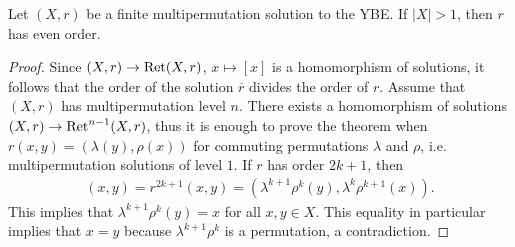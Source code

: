 


    

    

\begin{theorem}\label{thm:ordermultipermutiation}
    Let $(X,r)$ be a finite multipermutation solution to the YBE. If $|X|>1$, then $r$ has even order. 
\end{theorem}

\begin{proof}
    Since $(X,r)\to\operatorname{Ret}(X,r)$, $x\mapsto[x]$ is a homomorphism of solutions, 
    it follows that the order of the solution $\overline{r}$ divides the order of $r$. 
    Assume that $(X,r)$ has multipermutation level $n$. 
    There exists a homomorphism of solutions $(X,r)\to\operatorname{Ret}^{n-1}(X,r)$, thus 
    it is enough to prove the theorem when
    $r(x,y)=(\lambda(y),\rho(x))$ for commuting permutations $\lambda$ and $\rho$, i.e. 
    multipermutation solutions of level $1$. If $r$ has order $2k+1$, then 
    \begin{align*}
        (x,y)=r^{2k+1}(x,y)=(\lambda^{k+1}\rho^k(y),\lambda^k\rho^{k+1}(x)).
    \end{align*}
    This implies that $\lambda^{k+1}\rho^k(y)=x$ for all $x,y\in X$. This equality in particular 
    implies that $x=y$ because $\lambda^{k+1}\rho^k$ is a permutation, a contradiction. 
\end{proof}
